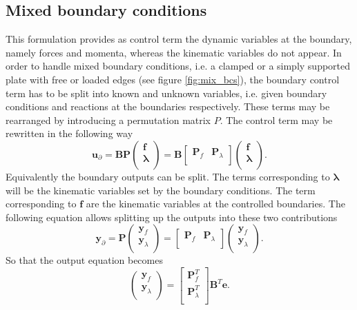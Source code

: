 \documentclass[preprint,12pt]{elsarticle}
\begin{document}
\subsection{Mixed boundary conditions}
\label{sec:mix_bd}
This formulation provides as control term the dynamic variables at the boundary, namely forces and momenta, whereas the kinematic variables do not appear. In order to handle mixed boundary conditions, i.e. a clamped or a simply supported plate with free or loaded edges (see figure \ref{fig:mix_bcs}), the boundary control term has to be split into known and unknown variables, i.e. given boundary conditions and reactions at the boundaries respectively. These terms may be rearranged by introducing a permutation matrix $P$. The control term may be rewritten in the following way
\begin{equation}
\bm{u}_{\partial} = \bm{B} \bm{P} 
\begin{pmatrix}
\bm{f} \\
\bm{\lambda} \\
\end{pmatrix} = 
\bm{B} \begin{bmatrix}
\bm{P}_{f} & \bm{P}_{\lambda} \\
\end{bmatrix}
\begin{pmatrix}
\bm{f} \\
\bm{\lambda} \\
\end{pmatrix}.
\end{equation}
Equivalently the boundary outputs can be split. The terms corresponding to $\bm\lambda$ will be the kinematic variables set by the boundary conditions. The term corresponding to $\bm{f}$ are the kinematic variables at the controlled boundaries. The following equation allows splitting up the outputs into these two contributions
\begin{equation}
\bm{y}_{\partial} = \bm{P}
\begin{pmatrix}
\bm{y}_{f} \\
\bm{y}_{\lambda} \\
\end{pmatrix} = 
\begin{bmatrix}
\bm{P}_{f} & \bm{P}_{\lambda} \\
\end{bmatrix}
\begin{pmatrix}
\bm{y}_{f} \\
\bm{y}_{\lambda} \\
\end{pmatrix}.
\end{equation}
So that the output equation becomes
\begin{equation}
\begin{pmatrix}
\bm{y}_{f} \\
\bm{y}_{\lambda} \\
\end{pmatrix} = 
\begin{bmatrix}
\bm{P}_{f}^T \\
\bm{P}_{\lambda}^T \\
\end{bmatrix}
\bm{B}^T \bm{e}.
\end{equation}
\end{document}
